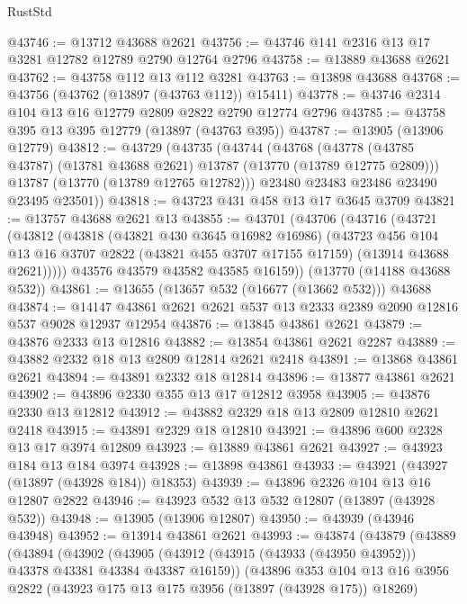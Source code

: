 \begin{lexlean}{RustStd}
\begin{coremodule}
@43746 := @13712 @43688 @2621
@43756 := @43746 @141 @2316 @13 @17 @3281 @12782 @12789 @2790 @12764 @2796
@43758 := @13889 @43688 @2621
@43762 := @43758 @112 @13 @112 @3281
@43763 := @13898 @43688
@43768 := @43756 (@43762 (@13897 (@43763 @112)) @15411)
@43778 := @43746 @2314 @104 @13 @16 @12779 @2809 @2822 @2790 @12774 @2796
@43785 := @43758 @395 @13 @395 @12779 (@13897 (@43763 @395))
@43787 := @13905 (@13906 @12779)
@43812 := @43729
    (@43735
      (@43744
        (@43768
          (@43778 (@43785 @43787) (@13781 @43688 @2621) @13787 (@13770 (@13789 @12775 @2809)))
          @13787
          (@13770 (@13789 @12765 @12782)))
        @23480
        @23483
        @23486
        @23490
        @23495
        @23501))
@43818 := @43723 @431 @458 @13 @17 @3645 @3709
@43821 := @13757 @43688 @2621 @13
@43855 := @43701
    (@43706
      (@43716
        (@43721
          (@43812
            (@43818
              (@43821 @430 @3645 @16982 @16986)
              (@43723
                @456
                @104
                @13
                @16
                @3707
                @2822
                (@43821 @455 @3707 @17155 @17159)
                (@13914 @43688 @2621)))))
        @43576
        @43579
        @43582
        @43585
        @16159))
    (@13770 (@14188 @43688 @532))
@43861 := @13655 (@13657 @532 (@16677 (@13662 @532))) @43688
@43874 := @14147 @43861 @2621 @2621 @537 @13 @2333 @2389 @2090 @12816 @537 @9028 @12937 @12954
@43876 := @13845 @43861 @2621
@43879 := @43876 @2333 @13 @12816
@43882 := @13854 @43861 @2621 @2287
@43889 := @43882 @2332 @18 @13 @2809 @12814 @2621 @2418
@43891 := @13868 @43861 @2621
@43894 := @43891 @2332 @18 @12814
@43896 := @13877 @43861 @2621
@43902 := @43896 @2330 @355 @13 @17 @12812 @3958
@43905 := @43876 @2330 @13 @12812
@43912 := @43882 @2329 @18 @13 @2809 @12810 @2621 @2418
@43915 := @43891 @2329 @18 @12810
@43921 := @43896 @600 @2328 @13 @17 @3974 @12809
@43923 := @13889 @43861 @2621
@43927 := @43923 @184 @13 @184 @3974
@43928 := @13898 @43861
@43933 := @43921 (@43927 (@13897 (@43928 @184)) @18353)
@43939 := @43896 @2326 @104 @13 @16 @12807 @2822
@43946 := @43923 @532 @13 @532 @12807 (@13897 (@43928 @532))
@43948 := @13905 (@13906 @12807)
@43950 := @43939 (@43946 @43948)
@43952 := @13914 @43861 @2621
@43993 := @43874
    (@43879
      (@43889
        (@43894
          (@43902
            (@43905 (@43912 (@43915 (@43933 (@43950 @43952))) @43378 @43381 @43384 @43387 @16159))
            (@43896
              @353
              @104
              @13
              @16
              @3956
              @2822
              (@43923 @175 @13 @175 @3956 (@13897 (@43928 @175)) @18269)

\end{coremodule}
\end{lexlean}
